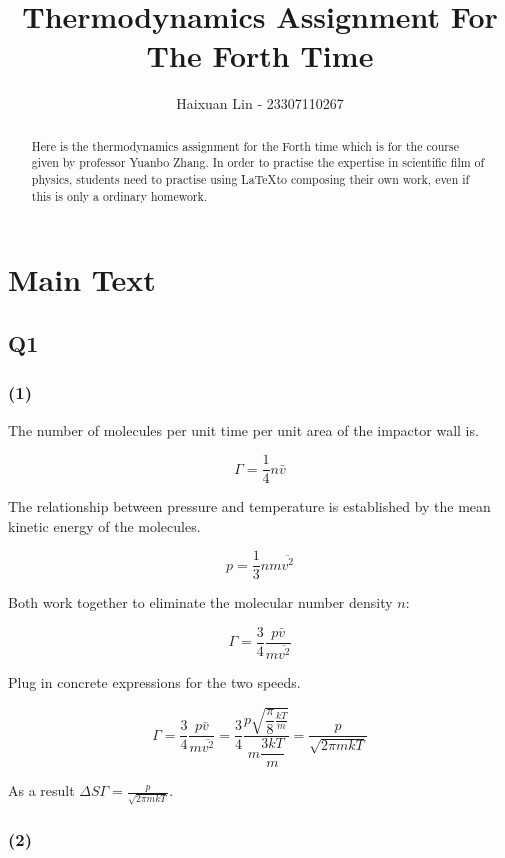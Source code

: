 \documentclass[a4paper,11pt]{amsart}
\title{Thermodynamics Assignment For The Forth Time}
\author{Haixuan Lin - 23307110267}
\theoremstyle{definition}
\begin{document}
	
	\begin{abstract}
		Here is the thermodynamics assignment for the Forth time which is for the course given by professor Yuanbo Zhang. In order to practise the expertise in scientific film of physics, students need to practise using \LaTeX to composing their own work, even if this is only a ordinary homework.
	\end{abstract}
	
	\maketitle
	
	\section*{Main Text}

	\subsection*{Q1}

	\subsubsection*{(1)}

	The number of molecules per unit time per unit area of the impactor wall is.

	$$
	\varGamma =\frac{1}{4}n\bar{v}
	$$
	
	The relationship between pressure and temperature is established by the mean kinetic energy of the molecules.

	$$
	p=\frac{1}{3}nm\overline{v^2}
	$$

	Both work together to eliminate the molecular number density $n$:

	$$
	\varGamma =\frac{3}{4}\frac{p\bar{v}}{m\overline{v^2}}
	$$

	Plug in concrete expressions for the two speeds.

	$$
	\varGamma =\dfrac{3}{4}\dfrac{p\bar{v}}{m\overline{v^2}}=\dfrac{3}{4}\dfrac{p\sqrt{\dfrac{\pi}{8}\frac{kT}{m}}}{m\dfrac{3kT}{m}}=\dfrac{p}{\sqrt{2\pi mkT}}
	$$

	As a result $\displaystyle\Delta S\varGamma=\frac{p}{\sqrt{2\pi mkT}}.$

	\subsubsection*{(2)}
\end{document}
